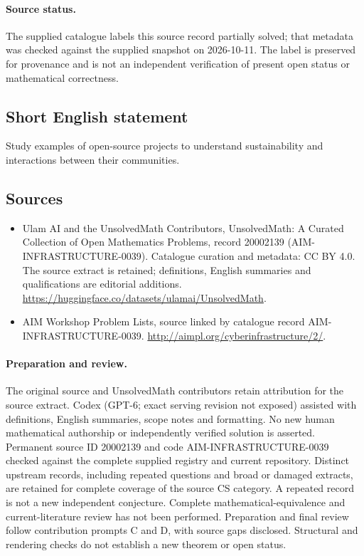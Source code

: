 \documentclass[11pt]{article}
\begin{document}
\paragraph{Source status.}
The supplied catalogue labels this source record partially solved; that metadata was checked against the supplied snapshot on 2026-10-11. The label is preserved for provenance and is not an independent verification of present open status or mathematical correctness.
\subsection{Short English statement}
Study examples of open-source projects to understand sustainability and interactions between their communities.
\subsection{Sources}
\begin{itemize}
\item[\hypertarget{source:20002139:1}{S1}] Ulam AI and the UnsolvedMath Contributors, UnsolvedMath: A Curated Collection of Open Mathematics Problems, record 20002139 (AIM-INFRASTRUCTURE-0039). Catalogue curation and metadata: CC BY 4.0. The source extract is retained; definitions, English summaries and qualifications are editorial additions.
\url{https://huggingface.co/datasets/ulamai/UnsolvedMath}.
\item[\hypertarget{source:20002139:2}{S2}] AIM Workshop Problem Lists, source linked by catalogue record AIM-INFRASTRUCTURE-0039.
\url{http://aimpl.org/cyberinfrastructure/2/}.
\end{itemize}
\paragraph{Preparation and review.}
The original source and UnsolvedMath contributors retain attribution for the source extract. Codex (GPT-6; exact serving revision not exposed) assisted with definitions, English summaries, scope notes and formatting. No new human mathematical authorship or independently verified solution is asserted. Permanent source ID 20002139 and code AIM-INFRASTRUCTURE-0039 checked against the complete supplied registry and current repository. Distinct upstream records, including repeated questions and broad or damaged extracts, are retained for complete coverage of the source CS category. A repeated record is not a new independent conjecture. Complete mathematical-equivalence and current-literature review has not been performed. Preparation and final review follow contribution prompts C and D, with source gaps disclosed. Structural and rendering checks do not establish a new theorem or open status.
\label{end:20002139}
\end{document}
